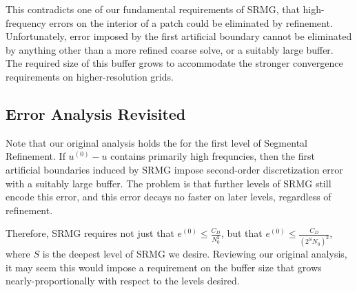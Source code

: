 \documentclass[final]{siamart1116}
\numberwithin{theorem}{section}
\begin{document}
This contradicts one of our fundamental requirements of SRMG, that high-frequency errors on the interior of a patch could be eliminated by refinement. Unfortunately, error imposed by the first artificial boundary cannot be eliminated by anything other than a more refined coarse solve, or a suitably large buffer. The required size of this buffer grows to accommodate the stronger convergence requirements on higher-resolution grids. 





\subsection{Error Analysis Revisited}

Note that our original analysis holds the for the first level of Segmental Refinement. If $u^{(0)} - u$ contains primarily high frequncies, then the first artificial boundaries induced by SRMG impose second-order discretization error with a suitably large buffer. The problem is that further levels of SRMG still encode this error, and this error decays no faster on later levels, regardless of refinement. 

Therefore, SRMG requires not just that $e^{(0)} \leq \frac{C_D}{N_0^2}$, but that $e^{(0)} \leq \frac{C_D}{(2^{S} N_0)^2 }$, where $S$ is the deepest level of SRMG we desire. Reviewing our original analysis, it may seem this would impose a requirement on the buffer size that grows nearly-proportionally with respect to the levels desired. 
\end{document}

